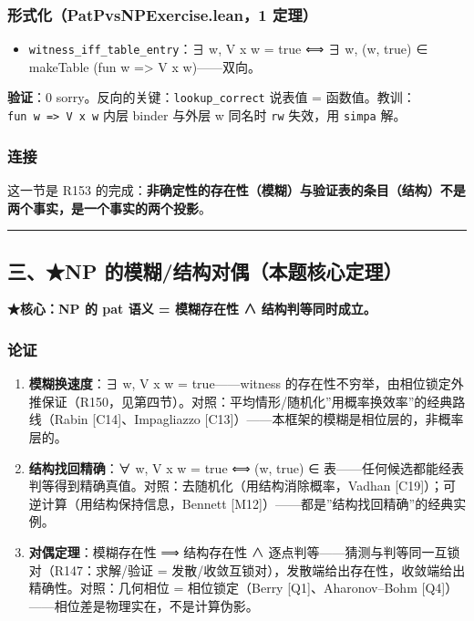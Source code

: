 \documentclass[
]{article}
\providecommand{\tightlist}{%
  \setlength{\itemsep}{0pt}\setlength{\parskip}{0pt}}
\begin{document}
\subsubsection{形式化（PatPvsNPExercise.lean，1
定理）}\label{ux5f62ux5f0fux5316patpvsnpexercise.lean1-ux5b9aux7406-1}

\begin{itemize}
\tightlist
\item
  \texttt{witness\_iff\_table\_entry}：∃ w, V x w = true ⟺ ∃ w, (w,
  true) ∈ makeTable (fun w =\textgreater{} V x w)------双向。
\end{itemize}

\textbf{验证}：0 sorry。反向的关键：\texttt{lookup\_correct} 说表值 =
函数值。教训：\texttt{fun\ w\ =\textgreater{}\ V\ x\ w} 内层 binder
与外层 w 同名时 \texttt{rw} 失效，用 \texttt{simpa} 解。

\subsubsection{连接}\label{ux8fdeux63a5-1}

这一节是 R153
的完成：\textbf{非确定性的存在性（模糊）与验证表的条目（结构）不是两个事实，是一个事实的两个投影}。

\begin{center}\rule{0.5\linewidth}{0.5pt}\end{center}

\subsection{三、★NP
的模糊/结构对偶（本题核心定理）}\label{ux4e09np-ux7684ux6a21ux7ccaux7ed3ux6784ux5bf9ux5076ux672cux9898ux6838ux5fc3ux5b9aux7406}

\textbf{★核心：NP 的 pat 语义 = 模糊存在性 ∧ 结构判等同时成立。}

\subsubsection{论证}\label{ux8bbaux8bc1-2}

\begin{enumerate}
\def\labelenumi{\arabic{enumi}.}
\tightlist
\item
  \textbf{模糊换速度}：∃ w, V x w = true------witness
  的存在性不穷举，由相位锁定外推保证（R150，见第四节）。对照：平均情形/随机化''用概率换效率''的经典路线（Rabin
  {[}C14{]}、Impagliazzo
  {[}C13{]}）------本框架的模糊是相位层的，非概率层的。
\item
  \textbf{结构找回精确}：∀ w, V x w = true ⟺ (w, true) ∈
  表------任何候选都能经表判等得到精确真值。对照：去随机化（用结构消除概率，Vadhan
  {[}C19{]}）；可逆计算（用结构保持信息，Bennett
  {[}M12{]}）------都是''结构找回精确''的经典实例。
\item
  \textbf{对偶定理}：模糊存在性 ⟹ 结构存在性 ∧
  逐点判等------猜测与判等同一互锁对（R147：求解/验证 =
  发散/收敛互锁对），发散端给出存在性，收敛端给出精确性。对照：几何相位
  = 相位锁定（Berry {[}Q1{]}、Aharonov--Bohm
  {[}Q4{]}）------相位差是物理实在，不是计算伪影。
\end{enumerate}
\end{document}
